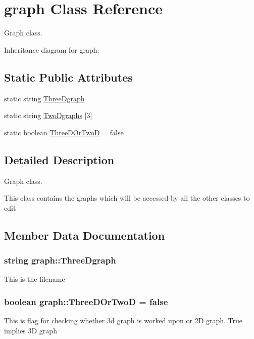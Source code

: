 \hypertarget{classgraph}{}\section{graph Class Reference}
\label{classgraph}


Graph class.  




Inheritance diagram for graph\+:
\subsection*{Static Public Attributes}
\begin{DoxyCompactItemize}
\item 
static string \hyperlink{classgraph_ae7ef3a07e00c4b673fc5d6254cf20f34}{Three\+Dgraph}
\item 
static string \hyperlink{classgraph_a718228685c9255e4d36f3f3c1294e607}{Two\+Dgraphs} \mbox{[}3\mbox{]}
\item 
static boolean \hyperlink{classgraph_ae9531d9ba52931cf97c3423d61ba8e5d}{Three\+D\+Or\+TwoD} = false
\end{DoxyCompactItemize}


\subsection{Detailed Description}
Graph class. 

This class contains the graphs which will be accessed by all the other classes to edit 

\subsection{Member Data Documentation}
\subsubsection[{\texorpdfstring{Three\+Dgraph}{ThreeDgraph}}]{\setlength{\rightskip}{0pt plus 5cm}string graph\+::\+Three\+Dgraph\hspace{0.3cm}{\ttfamily [static]}}\hypertarget{classgraph_ae7ef3a07e00c4b673fc5d6254cf20f34}{}\label{classgraph_ae7ef3a07e00c4b673fc5d6254cf20f34}
This is the filename 
\subsubsection[{\texorpdfstring{Three\+D\+Or\+TwoD}{ThreeDOrTwoD}}]{\setlength{\rightskip}{0pt plus 5cm}boolean graph\+::\+Three\+D\+Or\+TwoD = false\hspace{0.3cm}{\ttfamily [static]}}\hypertarget{classgraph_ae9531d9ba52931cf97c3423d61ba8e5d}{}\label{classgraph_ae9531d9ba52931cf97c3423d61ba8e5d}
This is flag for checking whether 3d graph is worked upon or 2D graph. True implies 3D graph 
